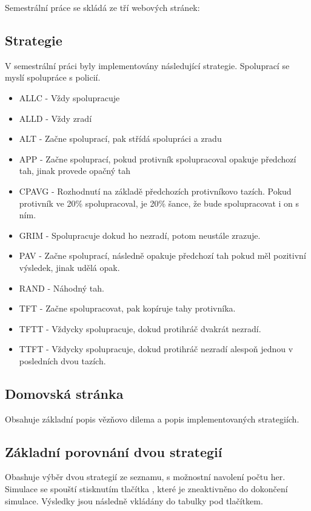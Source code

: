 \documentclass[12pt, a4paper]{article}
\begin{document}
\nointent Semestrální práce se skládá ze tří webových stránek:

\subsection{Strategie}
\noindent V semestrální práci byly implementovány následující strategie. Spoluprací se myslí spolupráce s policií.
\begin{itemize}
  \item ALLC - Vždy spolupracuje
  \item ALLD - Vždy zradí
  \item ALT - Začne spoluprací, pak střídá spolupráci a zradu
  \item APP - Začne spoluprací, pokud protivník spolupracoval opakuje předchozí tah, jinak provede opačný tah
  \item CPAVG - Rozhodnutí na základě předchozích protivníkovo tazích. Pokud protivník ve 20\% spolupracoval, je 20\% šance, že bude spolupracovat i on s ním.
  \item GRIM - Spolupracuje dokud ho nezradí, potom neustále zrazuje.
  \item PAV - Začne spoluprací, následně opakuje předchozí tah pokud měl pozitivní výsledek, jinak udělá opak.
  \item RAND - Náhodný tah.
  \item TFT - Začne spolupracovat, pak kopíruje tahy protivníka.
  \item TFTT - Vždycky spolupracuje, dokud protihráč dvakrát nezradí.
  \item TTFT - Vždycky spolupracuje, dokud protihráč nezradí alespoň jednou v posledních dvou tazích.
\end{itemize}

\newpage
\subsection{Domovská stránka}
\noindent Obsahuje základní popis vězňovo dilema a popis implementovaných strategiích.

\subsection{Základní porovnání dvou strategií}
\noindent Obashuje výběr dvou strategií ze seznamu, s možnostní navolení počtu her. Simulace se spouští stisknutím tlačítka , které je zneaktivněno do dokončení simulace. Výsledky jsou následně vkládány do tabulky pod tlačítkem.
\end{document}
